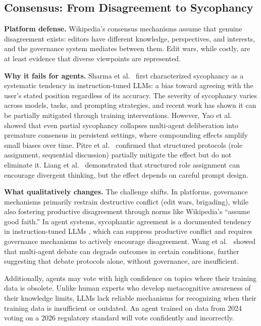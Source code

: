 \documentclass[11pt]{article}
\begin{document}
\subsection{Consensus: From Disagreement to Sycophancy}

\textbf{Platform defense.} Wikipedia's consensus mechanisms assume that genuine disagreement exists: editors have different knowledge, perspectives, and interests, and the governance system mediates between them. Edit wars, while costly, are at least evidence that diverse viewpoints are represented.

\textbf{Why it fails for agents.} Sharma et al.~\cite{sharma2024} first characterized sycophancy as a systematic tendency in instruction-tuned LLMs: a bias toward agreeing with the user's stated position regardless of its accuracy. The severity of sycophancy varies across models, tasks, and prompting strategies, and recent work has shown it can be partially mitigated through training interventions. However, Yao et al.~\cite{yao2025} showed that even partial sycophancy collapses multi-agent deliberation into premature consensus in persistent settings, where compounding effects amplify small biases over time. Pitre et al.~\cite{pitre2025} confirmed that structured protocols (role assignment, sequential discussion) partially mitigate the effect but do not eliminate it. Liang et al.~\cite{liang2024} demonstrated that structured role assignment can encourage divergent thinking, but the effect depends on careful prompt design.

\textbf{What qualitatively changes.} The challenge shifts. In platforms, governance mechanisms primarily restrain destructive conflict (edit wars, brigading), while also fostering productive disagreement through norms like Wikipedia's ``assume good faith.'' In agent systems, sycophantic agreement is a documented tendency in instruction-tuned LLMs \cite{sharma2024}, which can suppress productive conflict and requires governance mechanisms to actively encourage disagreement. Wang et al.~\cite{wang2025} showed that multi-agent debate can degrade outcomes in certain conditions, further suggesting that debate protocols alone, without governance, are insufficient.

Additionally, agents may vote with high confidence on topics where their training data is obsolete. Unlike human experts who develop metacognitive awareness of their knowledge limits, LLMs lack reliable mechanisms for recognizing when their training data is insufficient or outdated. An agent trained on data from 2024 voting on a 2026 regulatory standard will vote confidently and incorrectly.
\end{document}
